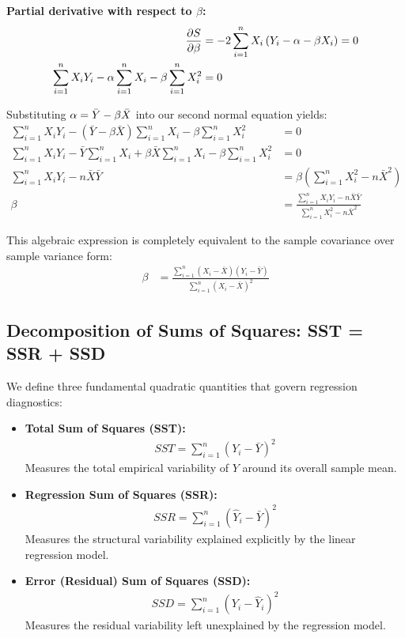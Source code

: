 \textbf{Partial derivative with respect to $\beta$:}
\begin{align}
	\frac{\partial S}{\partial \beta} &= -2 \sum_{i=1}^{n} X_i \left( Y_i - \alpha - \beta X_i \right) = 0 \\
	\sum_{i=1}^{n} X_i Y_i - \alpha \sum_{i=1}^{n} X_i - \beta \sum_{i=1}^{n} X_i^2 &= 0
\end{align}

Substituting $\alpha = \bar{Y} - \beta \bar{X}$ into our second normal equation yields:
\begin{align}
	\sum_{i=1}^{n} X_i Y_i - (\bar{Y} - \beta \bar{X}) \sum_{i=1}^{n} X_i - \beta \sum_{i=1}^{n} X_i^2 &= 0 \\
	\sum_{i=1}^{n} X_i Y_i - \bar{Y} \sum_{i=1}^{n} X_i + \beta \bar{X} \sum_{i=1}^{n} X_i - \beta \sum_{i=1}^{n} X_i^2 &= 0 \\
	\sum_{i=1}^{n} X_i Y_i - n\bar{X}\bar{Y} &= \beta \left( \sum_{i=1}^{n} X_i^2 - n\bar{X}^2 \right) \\
	\beta &= \frac{\sum_{i=1}^{n} X_i Y_i - n\bar{X}\bar{Y}}{\sum_{i=1}^{n} X_i^2 - n\bar{X}^2}
\end{align}

This algebraic expression is completely equivalent to the sample covariance over sample variance form:
\begin{align}
	\beta &= \frac{\sum_{i=1}^{n} (X_i - \bar{X})(Y_i - \bar{Y})}{\sum_{i=1}^{n} (X_i - \bar{X})^2}
\end{align}

\subsection{Decomposition of Sums of Squares: SST = SSR + SSD}

We define three fundamental quadratic quantities that govern regression diagnostics:

\begin{itemize}
	\item \textbf{Total Sum of Squares (SST):}
	\begin{align}
		SST = \sum_{i=1}^{n} (Y_i - \bar{Y})^2
	\end{align}
	Measures the total empirical variability of $Y$ around its overall sample mean.
	
	\item \textbf{Regression Sum of Squares (SSR):}
	\begin{align}
		SSR = \sum_{i=1}^{n} (\hat{Y}_i - \bar{Y})^2
	\end{align}
	Measures the structural variability explained explicitly by the linear regression model.
	
	\item \textbf{Error (Residual) Sum of Squares (SSD):}
	\begin{align}
		SSD = \sum_{i=1}^{n} (Y_i - \hat{Y}_i)^2
	\end{align}
	Measures the residual variability left unexplained by the regression model.
\end{itemize}

